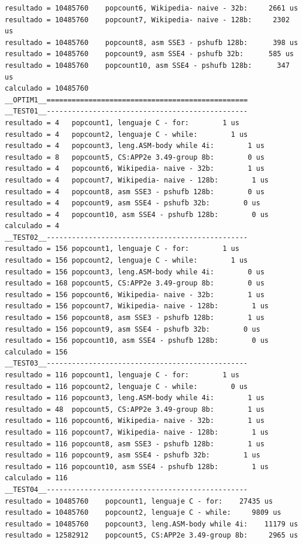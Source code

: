\begin{lstlisting}[frame=single]
resultado = 10485760	popcount6, Wikipedia- naive - 32b:     2661 us
resultado = 10485760	popcount7, Wikipedia- naive - 128b:     2302 us
resultado = 10485760	popcount8, asm SSE3 - pshufb 128b:      398 us
resultado = 10485760	popcount9, asm SSE4 - pshufb 32b:      585 us
resultado = 10485760	popcount10, asm SSE4 - pshufb 128b:      347 us
calculado = 10485760
__OPTIM1__================================================
__TEST01__------------------------------------------------
resultado = 4	popcount1, lenguaje C - for:        1 us
resultado = 4	popcount2, lenguaje C - while:        1 us
resultado = 4	popcount3, leng.ASM-body while 4i:        1 us
resultado = 8	popcount5, CS:APP2e 3.49-group 8b:        0 us
resultado = 4	popcount6, Wikipedia- naive - 32b:        1 us
resultado = 4	popcount7, Wikipedia- naive - 128b:        1 us
resultado = 4	popcount8, asm SSE3 - pshufb 128b:        0 us
resultado = 4	popcount9, asm SSE4 - pshufb 32b:        0 us
resultado = 4	popcount10, asm SSE4 - pshufb 128b:        0 us
calculado = 4
__TEST02__------------------------------------------------
resultado = 156	popcount1, lenguaje C - for:        1 us
resultado = 156	popcount2, lenguaje C - while:        1 us
resultado = 156	popcount3, leng.ASM-body while 4i:        0 us
resultado = 168	popcount5, CS:APP2e 3.49-group 8b:        0 us
resultado = 156	popcount6, Wikipedia- naive - 32b:        1 us
resultado = 156	popcount7, Wikipedia- naive - 128b:        1 us
resultado = 156	popcount8, asm SSE3 - pshufb 128b:        1 us
resultado = 156	popcount9, asm SSE4 - pshufb 32b:        0 us
resultado = 156	popcount10, asm SSE4 - pshufb 128b:        0 us
calculado = 156
__TEST03__------------------------------------------------
resultado = 116	popcount1, lenguaje C - for:        1 us
resultado = 116	popcount2, lenguaje C - while:        0 us
resultado = 116	popcount3, leng.ASM-body while 4i:        1 us
resultado = 48	popcount5, CS:APP2e 3.49-group 8b:        1 us
resultado = 116	popcount6, Wikipedia- naive - 32b:        1 us
resultado = 116	popcount7, Wikipedia- naive - 128b:        1 us
resultado = 116	popcount8, asm SSE3 - pshufb 128b:        1 us
resultado = 116	popcount9, asm SSE4 - pshufb 32b:        1 us
resultado = 116	popcount10, asm SSE4 - pshufb 128b:        1 us
calculado = 116
__TEST04__------------------------------------------------
resultado = 10485760	popcount1, lenguaje C - for:    27435 us
resultado = 10485760	popcount2, lenguaje C - while:     9809 us
resultado = 10485760	popcount3, leng.ASM-body while 4i:    11179 us
resultado = 12582912	popcount5, CS:APP2e 3.49-group 8b:     2965 us

\end{lstlisting}
